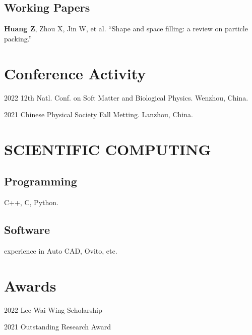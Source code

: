 \documentclass[12pt,letterpaper]{report}
\begin{document}
	\subsection*{Working Papers}
	
	\begin{tablist}
		
		\textbf{Huang Z}, Zhou X, Jin W, et al. \enquote{Shape and space filling: a review on particle packing.}
		
		
	\end{tablist}
	
	\section*{Conference Activity}
	
	\begin{tablist}
		
		\item[2022] \tab{}12th Natl. Conf. on Soft Matter and Biological Physics. Wenzhou, China.
		
		\item[2021] \tab{}Chinese Physical Society Fall Metting. Lanzhou, China.
		
	\end{tablist}
	
	
	
	
	
	\section*{SCIENTIFIC COMPUTING}
	
	\subsection*{ Programming}
	
	\begin{tablist}
		
		C++, C, Python.
	\end{tablist}
	
	\subsection*{Software}
	
	\begin{tablist}
		
		 experience in Auto CAD, Ovito, etc.
		
	\end{tablist}

	\section*{Awards}
	
	\begin{tablist}
		
		\item[2022] \tab{}Lee Wai Wing Scholarship
		
		\item[2021] \tab{}Outstanding Research Award
		
	\end{tablist}
	
	
	
	
	
\end{document}
